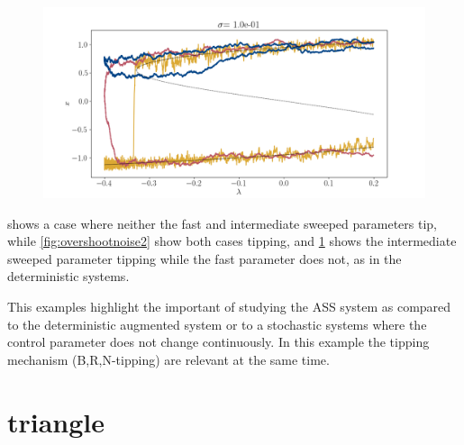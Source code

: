 \begin{figure}
	\centering
	\includegraphics[width=0.9\linewidth]{Images/Metrics/overshoot_noise3}
	\caption{}
	\label{fig:overshootnoise3}
\end{figure}

 shows a case where neither the fast and intermediate sweeped parameters tip, while \cref{fig:overshootnoise2} show both cases tipping, and \ref{fig:overshootnoise3} shows the intermediate sweeped parameter tipping while the fast parameter does not, as in the deterministic systems.  

This examples highlight the important of studying the ASS system as compared to the deterministic augmented system or to a stochastic systems where the control parameter does not change continuously. 
In this example the  tipping mechanism (B,R,N-tipping) are relevant at the same time. 

\section{triangle}

